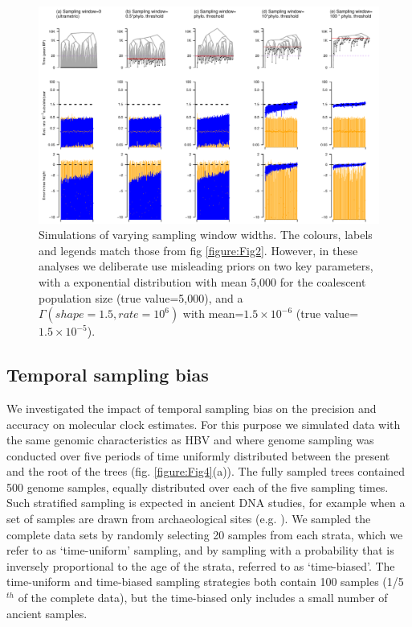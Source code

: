 \documentclass[11pt]{article}
\begin{document}
\begin{landscape}
	\begin{figure}[H]
		\begin{center}
			\includegraphics[scale=0.7, angle=0]{summary_all_estimates_misleading_prior.pdf}
			\caption{Simulations of varying sampling window widths. The colours, labels and legends match those from fig \ref{figure:Fig2}. However, in these analyses we deliberate use misleading priors on two key parameters, with a exponential distribution with mean 5,000 for the coalescent population size (true value=5,000), and a $\Gamma(shape=1.5, rate=10^{6})$ with mean=$1.5\times10^{-6}$ (true value=$1.5\times10^{-5}$).}
			\label{figure:Fig3}
		\end{center}
	\end{figure}
\end{landscape}


\subsection{Temporal sampling bias}
We investigated the impact of temporal sampling bias on the precision and accuracy on molecular clock estimates. For this purpose we simulated data with the same genomic characteristics as HBV and where genome sampling was conducted over five periods of time uniformly distributed between the present and the root of the trees (fig. \ref{figure:Fig4}(a)). The fully sampled trees contained 500 genome samples, equally distributed over each of the five sampling times. Such stratified sampling is expected in ancient DNA studies, for example when a set of samples are drawn from archaeological sites (e.g. \cite{spyrou2019phylogeography}). We sampled the complete data sets by randomly selecting 20 samples from each strata, which we refer to as `time-uniform' sampling, and by sampling with a probability that is inversely proportional to the age of the strata, referred to as `time-biased'. The time-uniform and time-biased sampling strategies both contain 100 samples (1/5$^{th}$ of the complete data), but the time-biased only includes a small number of ancient samples.
\end{document}
